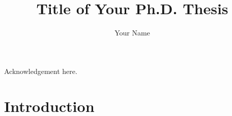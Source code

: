 \documentclass[11pt]{gsasthesis} %
\title{Title of Your Ph.D. Thesis} %
\author{Your Name} %
\begin{document}


\thesistitlepage
\committeepage
\begin{abstract}
\end{abstract}

\begin{cabstract}


\end{cabstract}

\renewcommand{\contentsname}{\protect\centering\protect\Large Contents}
\renewcommand{\listtablename}{\protect\centering\protect\Large List of Tables}
\renewcommand{\listfigurename}{\protect\centering\protect\Large List of Figures}

\tableofcontents %

\listoftables
\listoffigures
\begin{acknowledgments}
  Acknowledgement here.   
  
\end{acknowledgments}



\chapter{Introduction}\label{ch:intro}

\end{document}
